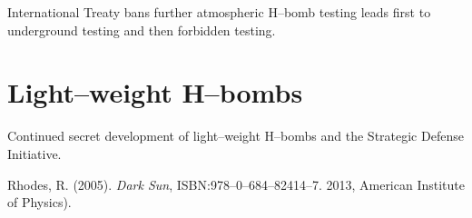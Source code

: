 \documentclass[a4paper,openany,12pt]{book}
\begin{document}
International Treaty bans further atmospheric H--bomb testing leads first to underground testing and then forbidden testing.

\section{Light--weight H--bombs}

Continued secret development of light--weight H--bombs and the Strategic Defense Initiative.

\begin{thebibliography}{175}

\bibitem{} 
Rhodes, R. (2005). {\it Dark Sun}, ISBN:978--0--684--82414--7.
2013, American Institute of Physics).

\end{thebibliography}
\end{document}
